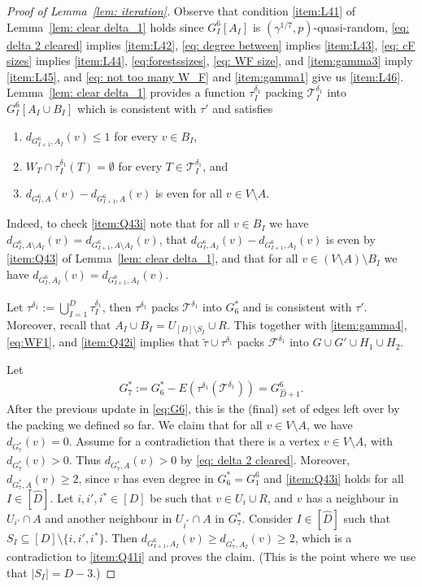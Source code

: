 \documentclass[a4paper, 11pt, reqno]{amsart}
\numberwithin{equation}{section}
\newcommand{\1}{{\rm 1\hspace*{-0.4ex}%
\rule{0.1ex}{1.52ex}\hspace*{0.2ex}}}
\newcommand{\es}{\emptyset}
\newcommand{\cF}{\mathcal{F}}
\newcommand{\I}{I}
\newcommand{\sT}{\mathscr{T}}
\newcommand{\sm}{\setminus}
\newcommand{\sub}{\subseteq}
\begin{document}
\begin{proof}[Proof of Lemma~\ref{lem: iteration}]
\noindent
Observe that condition \ref{item:L41} of Lemma~\ref{lem: clear delta_1} holds since $G^6_{\I}[A_{\I}]$ is $(\gamma^{1/7},p)$-quasi-random,
\eqref{eq: delta 2 cleared} implies \ref{item:L42}, 
\eqref{eq: degree between} implies \ref{item:L43}, 
\eqref{eq: cF sizes} implies \ref{item:L44}, 
\eqref{eq:forestssizes}, \eqref{eq: WF size}, and \ref{item:gamma3} imply \ref{item:L45}, and 
\eqref{eq: not too many W_F} and \ref{item:gamma1} give us \ref{item:L46}.
Lemma~\ref{lem: clear delta_1} provides a function $\tau^{\delta_1}_{\I}$ packing $\sT^{\delta_1}_{\I}$ into $G_{\I}^6[A_\I\cup B_\I]$ 
which is consistent with $\tau'$ and satisfies
\begin{enumerate}[label=(Q4.\arabic*)$_{\I}$]
\item\label{item:Q41i} $d_{G^6_{\I+1},A_\I}(v) \leq 1$ for every $v\in B_\I$,
\item\label{item:Q42i} $W_{T}\cap \tau^{\delta_1}_{\I}(T) =\es$ for every $T\in \sT^{\delta_1}_{\I}$, and
\item\label{item:Q43i} $d_{G^6_{\I}, A}(v) - d_{G^6_{{\I}+1},A}(v)$ is even for all $v\in V\sm A$. 
\end{enumerate}

Indeed, to check \ref{item:Q43i} note that for all $v\in B_\I$
we have $d_{G^6_{\I}, A\sm A_\I}(v) = d_{G^6_{{\I}+1},A\sm A_\I}(v)$, 
that $d_{G^6_{\I}, A_\I}(v) - d_{G^6_{{\I}+1},A_\I}(v)$ is even by \ref{item:Q43} of Lemma~\ref{lem: clear delta_1},
and that for all $v\in (V\sm A)\sm B_I$ we have $d_{G^6_{\I}, A_\I}(v) = d_{G^6_{{\I}+1},A_\I}(v)$.

Let $\tau^{\delta_1}:= \bigcup_{{\I}=1}^{\hat{D}} \tau^{\delta_1}_{\I}$, then $\tau^{\delta_1}$
packs $\sT^{\delta_1}$ into $G_6^*$ and is consistent with $\tau'$. 
Moreover, recall that $A_I\cup B_I = U_{[D]\setminus S_I} \cup R$.
This together with \ref{item:gamma4}, \eqref{eq:WF1},
and \ref{item:Q42i} implies that
$\tilde{\tau}\cup \tau^{\delta_1}$ packs $\cF^{\delta_1}$ into $G\cup G'\cup H_1\cup H_2$.

Let 
\begin{align}\label{eq:G7}
	G^*_7:= G^*_6 - E(\tau^{\delta_1}(\sT^{\delta_1}))=G^6_{\hat{D}+1}.
\end{align}
After the previous update in \eqref{eq:G6}, this is the (final) set of edges left over by the packing we defined so far.
We claim that for all $v\in V\sm A$,
we have $d_{G^*_7}(v)=0$.
Assume for a contradiction that there is a vertex $v\in V\setminus A$, with $d_{G^*_7}(v)>0$. 
Thus $d_{G^*_7,A}(v)>0$ by \eqref{eq: delta 2 cleared}.
Moreover, $d_{G^*_7,A}(v)\geq 2$, since $v$ has even degree in $G_6^*=G^6_1$ and \ref{item:Q43i} holds for all ${\I}\in [\hat{D}]$. 
Let $i,i',i^{*}\in[D]$ be such that $v\in U_i \cup R$, and $v$ has a neighbour in $U_{i'}\cap A$ and another neighbour in $U_{i^*}\cap A$ in $G^*_7$. 
Consider ${\I}\in [\hat{D}]$ such that $S_{{\I}} \sub [D]\setminus\{i,i',i^{*}\}$. 
Then $d_{G^6_{\I+1},A_{\I}}(v)\geq d_{G^*_7,A_{\I}}(v) \geq 2$, which is a contradiction to \ref{item:Q41i}
and proves the claim. (This is the point where we use that $|S_{I}|=D-3$.)



\end{proof}
\end{document}
